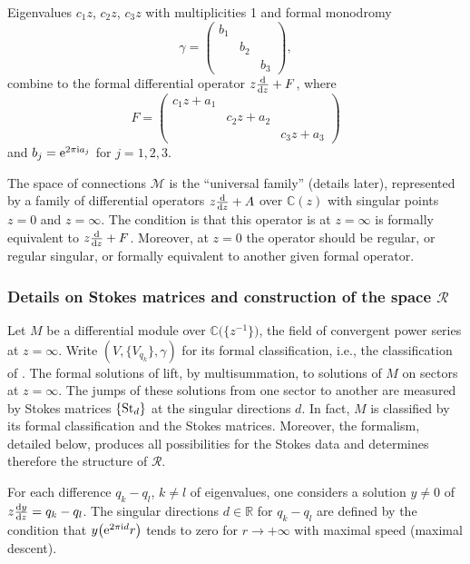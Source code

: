 \documentclass[10pt,a4paper]{amsart}
\numberwithin{equation}{section}
\begin{document}
\begin{Example} Eigenvalues $c_1z$, $c_2z$, $c_3z$ with multiplicities 1 and formal monodromy
\[
\gamma=\begin{pmatrix} b_1 & & \\ & b_2 & \\ & & b_3 \end{pmatrix},
\]
 combine to
the formal differential operator $z\frac{{\rm d}}{{\rm d}z}+F$, where
\[
F=\begin{pmatrix} c_1z+ a_1 & & \\ & c_2z+a_2 & \\ & & c_3z+a_3 \end{pmatrix}
\]
and $b_j={\rm e}^{2 \pi {\rm i} a_j}$ for $j=1,2,3$.
\end{Example}

The space of connections $\mathcal{M}$ is the ``universal family'' (details later), represented by a
family of differential operators $z\frac{{\rm d}}{{\rm d}z}+A$ over $\mathbb{C}(z)$ with singular points $z=0$ and $z=\infty$.
The condition is that this operator is at $z=\infty$ is formally equivalent to $z\frac{{\rm d}}{{\rm d}z}+F$. Moreover, at $z=0$ the operator
should be regular, or regular singular, or formally equivalent to another given formal operator.

\subsubsection[Details on Stokes matrices and construction of the space R]{Details on Stokes matrices and construction of the space $\boldsymbol{\mathcal{R}}$}
Let $M$ be a differential module over $\mathbb{C}\bigl(\bigl\{ z^{-1}\bigr\}\bigr)$, the field of convergent power series at $z=\infty$.
Write $(V, \{V_{q_k}\}, \gamma)$ for its formal classification, i.e., the classification of
. The formal solutions of  lift, by multisummation, to solutions of $M$ on sectors
at $z=\infty$. The jumps of these solutions from one sector to another are measured by
Stokes matrices $\{{\rm St}_d\}$ at the singular directions $d$. In fact, $M$ is classified by its formal classification and the
Stokes matrices. Moreover, the formalism, detailed below, produces all possibilities for the Stokes data and
determines therefore the structure of $\mathcal{R}$.


For each difference $q_k-q_l$, $ k\neq l$ of eigenvalues, one considers
a solution $y\neq 0$ of $z\frac{{\rm d}y}{{\rm d}z}=q_k-q_l$. The singular directions $d\in \mathbb{R}$ for $q_k-q_l$
are defined by the condition that $y\bigl({\rm e}^{2\pi {\rm i} d}r\bigr)$ tends to zero for $r\rightarrow +\infty$ with maximal speed (maximal descent).
\end{document}
